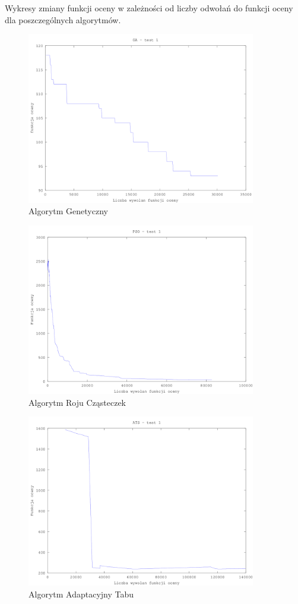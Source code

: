 \par  Wykresy zmiany funkcji oceny w zależności od liczby odwołań do funkcji oceny dla poszczególnych algorytmów. 
\begin{figure}[H]
  \caption{Algorytm Genetyczny}
  \centering
    \includegraphics[width=10cm]{ga_test_1.png}
\end{figure}
\begin{figure}[H]
  \caption{Algorytm Roju Cząsteczek}
  \centering
    \includegraphics[width=10cm]{pso_1.png}
\end{figure}
\begin{figure}[H]
  \caption{Algorytm Adaptacyjny Tabu}
  \centering
    \includegraphics[width=10cm]{ats_test_1.png}
\end{figure}

